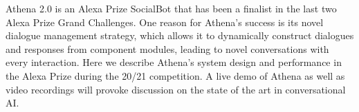 Athena 2.0 is an Alexa Prize SocialBot that has been a finalist in the last two Alexa Prize Grand Challenges. One reason for Athena's success is its novel dialogue management strategy, which allows it to dynamically construct dialogues and responses from component modules, leading to novel conversations with every interaction. Here we describe Athena's system design and performance in the Alexa Prize during the 20/21 competition. A live demo of Athena as well as video recordings  will provoke discussion on the state of the art in conversational AI.